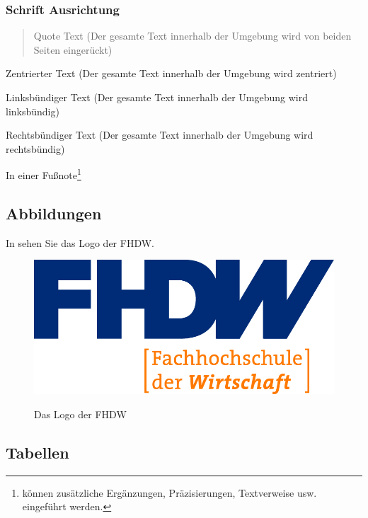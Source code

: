 \subsubsection{Schrift Ausrichtung}
\label{sec:Schrift Ausrichtung}
\begin{quote}
Quote Text (Der gesamte Text innerhalb der Umgebung wird von beiden Seiten eingerückt)
\end{quote}
\begin{center}
Zentrierter Text (Der gesamte Text innerhalb der Umgebung wird zentriert)
\end{center}
\begin{flushleft}
Linksbündiger Text (Der gesamte Text innerhalb der Umgebung wird linksbündig)
\end{flushleft}
\begin{flushright}
Rechtsbündiger Text (Der gesamte Text innerhalb der Umgebung wird rechtsbündig)
\end{flushright}
In einer Fußnote\footnote{können zusätzliche Ergänzungen, Präzisierungen, Textverweise usw. eingeführt werden.}

\subsection{Abbildungen}

In sehen Sie das Logo der FHDW.

\begin{figure}[hbt]
\centering
\begin{minipage}[t]{.7\textwidth} %
\caption{Das Logo der FHDW} %
\includegraphics[width=1\textwidth]{img/fhdw}\\ %
\label{fig:fhdw}
\end{minipage}
\end{figure}

\subsection{Tabellen}

